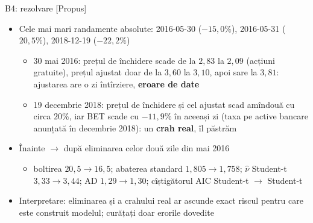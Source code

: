 \ifsolutions
\begin{frame}{B4: rezolvare [Propus]}
\itemsize{\scriptsize}
\begin{itemize}
    \item Cele mai mari randamente absolute: 2016-05-30 ($-15{,}0\%$), 2016-05-31 ($20{,}5\%$), 2018-12-19 ($-22{,}2\%$)
    \begin{itemize}
        \item 30 mai 2016: prețul de închidere scade de la $2{,}83$ la $2{,}09$ (acțiuni gratuite), prețul ajustat doar de la $3{,}60$ la $3{,}10$, apoi sare la $3{,}81$: ajustarea are o zi întîrziere, \textbf{eroare de date}
        \item 19 decembrie 2018: prețul de închidere și cel ajustat scad amîndouă cu circa $20\%$, iar BET scade cu $-11{,}9\%$ în aceeași zi (taxa pe active bancare anunțată în decembrie 2018): un \textbf{crah real}, îl păstrăm
    \end{itemize}
    \item Înainte $\to$ după eliminarea celor două zile din mai 2016
    \begin{itemize}
        \item boltirea $20{,}5 \to 16{,}5$; abaterea standard $1{,}805 \to 1{,}758$; $\hat\nu$ Student-t $3{,}33 \to 3{,}44$; AD $1{,}29 \to 1{,}30$; cîștigătorul AIC Student-t $\to$ Student-t
    \end{itemize}
    \item Interpretare: eliminarea și a crahului real ar ascunde exact riscul pentru care este construit modelul; curățați doar erorile dovedite
\end{itemize}
\end{frame}
\fi

